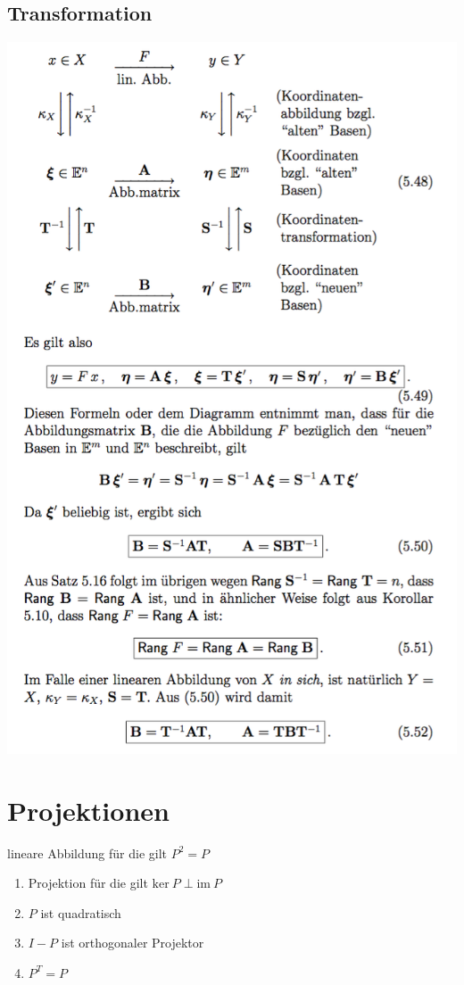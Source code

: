 \documentclass[11pt]{article}
\begin{document}
\subsection{Transformation}
\begin{center}
	\includegraphics[width=400pt]{images/transformation}
\end{center}

\section{Projektionen}

\begin{description}[labelindent=16pt,style=multiline,leftmargin=5cm, noitemsep]
	\item[Projektion] lineare Abbildung f{\"u}r die gilt $P^2 = P$
	\item[Orthogonalprojektion]
	\begin{enumerate}
		\item Projektion f{\"u}r die gilt $\text{ker}\ P \perp \text{im}\ P$
		\item $P$ ist quadratisch
		\item $I-P$ ist orthogonaler Projektor
		\item $P^T = P$
	\end{enumerate}
\end{description}
\end{document}
